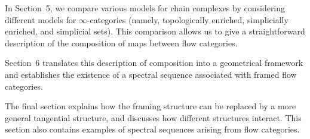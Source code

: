 In Section~5, we compare various models for chain complexes by considering different models for $\infty$-categories (namely, topologically enriched, simplicially enriched, and simplicial sets). This comparison allows us to give a straightforward description of the composition of maps between flow categories.

Section~6 translates this description of composition into a geometrical framework and establishes the existence of a spectral sequence associated with framed flow categories.

The final section explains how the framing structure can be replaced by a more general tangential structure, and discusses how different structures interact. This section also contains examples of spectral sequences arising from flow categories.
